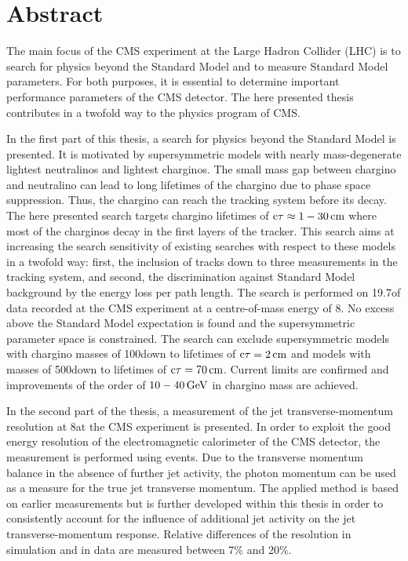 \chapter*{Abstract}

The main focus of the CMS experiment at the Large Hadron Collider (LHC) is to search for physics beyond the Standard Model and to measure Standard Model parameters.
For both purposes, it is essential to determine important performance parameters of the CMS detector.
The here presented thesis contributes in a twofold way to the physics program of CMS.

In the first part of this thesis, a search for physics beyond the Standard Model is presented.
It is motivated by supersymmetric models with nearly mass-degenerate lightest neutralinos and lightest charginos.
The small mass gap between chargino and neutralino can lead to long lifetimes of the chargino due to phase space suppression.
Thus, the chargino can reach the tracking system before its decay.
The here presented search targets chargino lifetimes of $\text{c}\tau \approx 1 - 30\,\text{cm} $ where most of the charginos decay in the first layers of the tracker. 
This search aims at increasing the search sensitivity of existing searches with respect to these models in a twofold way: first, the inclusion of tracks down to three measurements in the tracking system, and second, the discrimination against Standard Model background by the energy loss per path length.
The search is performed on 19.7\fbinv of data recorded at the CMS experiment at a centre-of-mass energy of 8\tev.
No excess above the Standard Model expectation is found and the supersymmetric parameter space is constrained.
The search can exclude supersymmetric models with chargino masses of 100\gev down to lifetimes of $\text{c}\tau=2\,\text{cm}$ and models with masses of 500\gev down to lifetimes of $\text{c}\tau=70\,\text{cm}$.
Current limits are confirmed and improvements of the order of $10-40\,\text{Ge}\kern-0.06667em\text{V}$ in chargino mass are achieved.

In the second part of the thesis, a measurement of the jet transverse-momentum resolution at 8\tev at the CMS experiment is presented.
In order to exploit the good energy resolution of the electromagnetic calorimeter of the CMS detector, the measurement is performed using \GAMJET events.
Due to the transverse momentum balance in the absence of further jet activity, the photon momentum can be used as a measure for the true jet transverse momentum. 
The applied method is based on earlier measurements but is further developed within this thesis in order to consistently account for the influence of additional jet activity on the jet transverse-momentum response.
Relative differences of the resolution in simulation and in data are measured between 7\% and 20\%. 

\cleardoublepage
